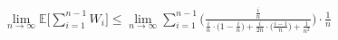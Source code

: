 \documentclass[preview]{standalone}
\begin{document}
\begin{align*}
\lim_{n\to\infty} \mathbb{E} \Bigg[ \sum_{i=1}^{n-1} W_i \Bigg] \leq \lim_{n\to\infty} \sum_{i=1}^{n-1} \bigg( \frac{\frac{i}{n}}{\frac{i}{n} \cdot \big(1-\frac{i}{n} \big) + \frac{i}{2n} \cdot \big(\frac{i-1}{n}\big) + \frac{1}{n^2}} \bigg) \cdot \frac{1}{n}
\end{align*}
\end{document}
